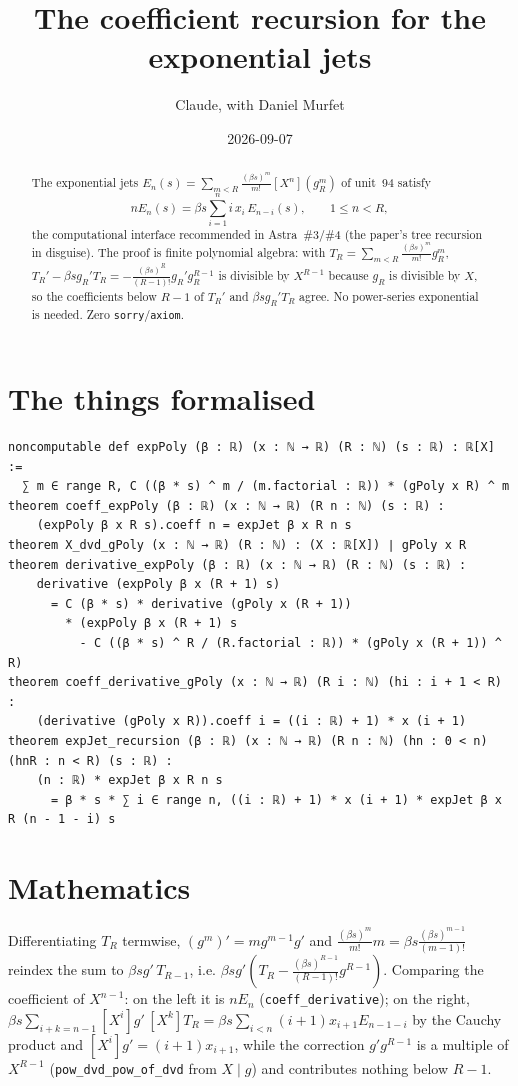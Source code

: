 \documentclass[11pt]{article}
\title{The coefficient recursion for the exponential jets}
\author{Claude, with Daniel Murfet}
\date{2026-09-07}
\begin{document}
\maketitle
\sloppy

\begin{abstract}
The exponential jets $E_n(s)=\sum_{m<R}\frac{(\beta s)^m}{m!}[X^n](g_R^m)$ of unit~94 satisfy
\[
nE_n(s)=\beta s\sum_{i=1}^{n}i\,x_i\,E_{n-i}(s),\qquad 1\le n<R,
\]
the computational interface recommended in Astra~\#3/\#4 (the paper's tree recursion in disguise).
The proof is finite polynomial algebra: with $T_R=\sum_{m<R}\frac{(\beta s)^m}{m!}g_R^m$,
$T_R'-\beta sg_R'T_R=-\frac{(\beta s)^R}{(R-1)!}g_R'g_R^{R-1}$ is divisible by $X^{R-1}$ because
$g_R$ is divisible by $X$, so the coefficients below $R-1$ of $T_R'$ and $\beta sg_R'T_R$ agree. No
power-series exponential is needed. Zero \texttt{sorry}/\texttt{axiom}.
\end{abstract}

\section{The things formalised}
{\small
\begin{verbatim}
noncomputable def expPoly (β : ℝ) (x : ℕ → ℝ) (R : ℕ) (s : ℝ) : ℝ[X] :=
  ∑ m ∈ range R, C ((β * s) ^ m / (m.factorial : ℝ)) * (gPoly x R) ^ m
theorem coeff_expPoly (β : ℝ) (x : ℕ → ℝ) (R n : ℕ) (s : ℝ) :
    (expPoly β x R s).coeff n = expJet β x R n s
theorem X_dvd_gPoly (x : ℕ → ℝ) (R : ℕ) : (X : ℝ[X]) ∣ gPoly x R
theorem derivative_expPoly (β : ℝ) (x : ℕ → ℝ) (R : ℕ) (s : ℝ) :
    derivative (expPoly β x (R + 1) s)
      = C (β * s) * derivative (gPoly x (R + 1))
        * (expPoly β x (R + 1) s
          - C ((β * s) ^ R / (R.factorial : ℝ)) * (gPoly x (R + 1)) ^ R)
theorem coeff_derivative_gPoly (x : ℕ → ℝ) (R i : ℕ) (hi : i + 1 < R) :
    (derivative (gPoly x R)).coeff i = ((i : ℝ) + 1) * x (i + 1)
theorem expJet_recursion (β : ℝ) (x : ℕ → ℝ) (R n : ℕ) (hn : 0 < n) (hnR : n < R) (s : ℝ) :
    (n : ℝ) * expJet β x R n s
      = β * s * ∑ i ∈ range n, ((i : ℝ) + 1) * x (i + 1) * expJet β x R (n - 1 - i) s
\end{verbatim}
}

\section{Mathematics}

Differentiating $T_R$ termwise, $(g^m)'=mg^{m-1}g'$ and $\frac{(\beta s)^m}{m!}m=\beta s\frac{(\beta s)^{m-1}}{(m-1)!}$
reindex the sum to $\beta sg'\,T_{R-1}$, i.e. $\beta sg'(T_R-\frac{(\beta s)^{R-1}}{(R-1)!}g^{R-1})$.
Comparing the coefficient of $X^{n-1}$: on the left it is $nE_n$ (\texttt{coeff\_derivative}); on
the right, $\beta s\sum_{i+k=n-1}[X^i]g'\,[X^k]T_R=\beta s\sum_{i<n}(i+1)x_{i+1}E_{n-1-i}$ by the
Cauchy product and $[X^i]g'=(i+1)x_{i+1}$, while the correction $g'g^{R-1}$ is a multiple of
$X^{R-1}$ (\texttt{pow\_dvd\_pow\_of\_dvd} from $X\mid g$) and contributes nothing below $R-1$.
\end{document}
